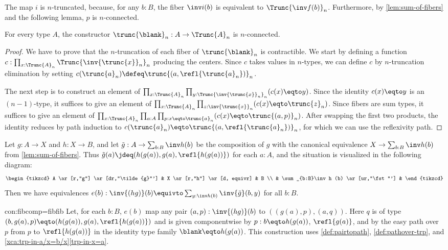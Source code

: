 The map $i$ is $n$-truncated, because, for any $b:B$, 
the fiber $\inv i (b)$ is equivalent to $\Trunc{\inv f (b)}_n$.
Furthermore, by \cref{lem:sum-of-fibers} and the following lemma, 
$p$ is $n$-connected.

\begin{lemma}\label{lem:trunc-n-connected}
For every type $A$, the constructor $\trunc{\blank}_n : A\to \Trunc{A}_n$
is $n$-connected.
\end{lemma}
\begin{proof}
We have to prove that the $n$-truncation of each fiber of $\trunc{\blank}_n$
is contractible. We start by defining a function
$c:\prod_{x:\Trunc{A}_n} \Trunc{\inv{\trunc{x}}_n}_n$ producing the centers.
Since $c$ takes values in $n$-types, we can define $c$ by
$n$-truncation elimination by setting
$c(\trunc{a}_n) \defeq \trunc{(a,\refl{\trunc{a}_n})}_n$.

The next step is to construct an element of
$\prod_{x:\Trunc{A}_n} \prod_{y:\Trunc{\inv{\trunc{x}}_n}_n} (c(x)\eqto y)$.
Since the identity $c(x)\eqto y$ is an $(n-1)$-type, it suffices to give an element of
$\prod_{x:\Trunc{A}_n} \prod_{z:\inv{\trunc{x}}_n} (c(x)\eqto \trunc{z}_n)$.
Since fibers are sum types,  it suffices to give an element of
$\prod_{x:\Trunc{A}_n} \prod_{a:A} \prod_{p: x\eqto \trunc{a}_n} (c(x)\eqto \trunc{(a,p)}_n)$.
After swapping the first two products, the identity reduces by path induction
to $c(\trunc{a}_n)\eqto \trunc{(a,\refl{\trunc{a}_n})}_n$, for which we can use
the reflexivity path.
\end{proof}

\begin{construction}\label{con:fibcomp=fibfib}
Let $g:A\to X$ and $h: X\to B$, and let $\tilde{g}:A\to \sum_{b:B}\inv h (b)$
be the composition of $g$ with the canonical equivalence 
$X\to \sum_{b:B}\inv h (b)$ from \cref{lem:sum-of-fibers}.
Thus $\tilde{g}(a)\jdeq (h(g(a)),g(a),\refl{h(g(a))})$ for each $a:A$,
and the situation is visualized in the following diagram:
  \[
    \begin{tikzcd}
      A \ar[r,"g"] \ar[dr,"\tilde{g}"'] & X \ar[r,"h"] \ar[d, equivr] & B \\
      & \sum_{b:B}\inv h (b) \ar[ur,"\fst"'] &
    \end{tikzcd}
  \]
Then we have equivalences $e(b) : \inv {(hg)} (b) \equivto \sum_{y:\inv h (b)} \inv {\tilde{g}}(b,y)$
for all $b:B$.
\end{construction}
\begin{implementation}{con:fibcomp=fibfib}
Let, for each $b:B$, $e(b)$ map any pair $(a,p):\inv {(hg)} (b)$ to
$((g(a),p),(a,q))$. Here $q$ is of type $(b,g(a),p) \eqto  (h(g(a)),g(a),\refl{h(g(a))})$
and is given componentwise by $p: b\eqto h(g(a))$, $\refl{g(a)}$, and by the
easy path over $p$ from $p$ to $\refl{h(g(a))}$ in the identity type family $\blank\eqto h(g(a))$.
This construction uses \cref{def:pairtopath}, \cref{def:pathover-trp},
and \cref{xca:trp-in-a/x=b/x}\ref{trp-in-x=a}.
\end{implementation}

